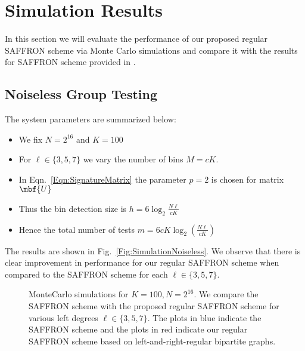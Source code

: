 \documentclass[conference,twocolumn]{IEEEtran}
\newcommand*{\FigPath}{../Figures}
\begin{document}
{\section{Simulation Results}
In this section we will evaluate the performance of our proposed regular SAFFRON scheme via Monte Carlo simulations and compare it with the results for SAFFRON scheme provided in \cite{lee2015saffron}.
\subsection*{Noiseless Group Testing}
The system parameters are summarized below:
\begin{itemize}
\item We fix $N=2^{16}$ and $K=100$
\item For $\ell\in\{3,5,7\}$ we vary the number of bins $M=c K$.
\item In Eqn.~\ref{Eqn:SignatureMatrix} the parameter $p=2$ is chosen for matrix $\mbf{U}$
\item Thus the bin detection size is $h=6\log_2 \frac{N\ell}{cK}$
\item Hence the total number of tests $m=6cK\log_2 \left(\frac{N\ell}{cK}\right)$
\end{itemize}
The results are shown in Fig.~\ref{Fig:SimulationNoiseless}. We observe that there is clear improvement in performance for our regular SAFFRON scheme when compared to the SAFFRON scheme for each $\ell\in\{3,5,7\}$.

\begin{figure}[t!]
\centering

\caption{MonteCarlo simulations for $K=100, N=2^{16}$. We compare the SAFFRON scheme \cite{lee2015saffron} with the proposed regular SAFFRON scheme for various left degrees $\ell\in\{3,5,7\}$.
The plots in blue indicate the SAFFRON scheme and the plots in red indicate our regular SAFFRON scheme based on left-and-right-regular bipartite graphs.}
\label{Fig:SimulationNoisy}
\end{figure}


}
\end{document}
